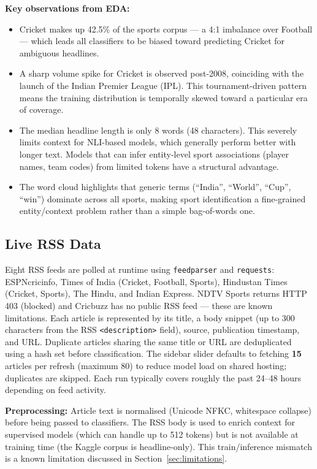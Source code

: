 \documentclass[11pt,a4paper]{article}
\begin{document}
\textbf{Key observations from EDA:}
\begin{itemize}[noitemsep]
  \item Cricket makes up 42.5\% of the sports corpus — a 4:1 imbalance over Football — which leads all classifiers to be biased toward predicting Cricket for ambiguous headlines.
  \item A sharp volume spike for Cricket is observed post-2008, coinciding with the launch of the Indian Premier League (IPL). This tournament-driven pattern means the training distribution is temporally skewed toward a particular era of coverage.
  \item The median headline length is only 8 words (48 characters). This severely limits context for NLI-based models, which generally perform better with longer text. Models that can infer entity-level sport associations (player names, team codes) from limited tokens have a structural advantage.
  \item The word cloud highlights that generic terms (``India'', ``World'', ``Cup'', ``win'') dominate across all sports, making sport identification a fine-grained entity/context problem rather than a simple bag-of-words one.
\end{itemize}

\subsection{Live RSS Data}

Eight RSS feeds are polled at runtime using \texttt{feedparser} and \texttt{requests}: ESPNcricinfo, Times of India (Cricket, Football, Sports), Hindustan Times (Cricket, Sports), The Hindu, and Indian Express. NDTV Sports returns HTTP 403 (blocked) and Cricbuzz has no public RSS feed — these are known limitations. Each article is represented by its title, a body snippet (up to 300 characters from the RSS \texttt{<description>} field), source, publication timestamp, and URL. Duplicate articles sharing the same title or URL are deduplicated using a hash set before classification. The sidebar slider defaults to fetching \textbf{15} articles per refresh (maximum 80) to reduce model load on shared hosting; duplicates are skipped. Each run typically covers roughly the past 24--48 hours depending on feed activity.

\textbf{Preprocessing:} Article text is normalised (Unicode NFKC, whitespace collapse) before being passed to classifiers. The RSS body is used to enrich context for supervised models (which can handle up to 512 tokens) but is not available at training time (the Kaggle corpus is headline-only). This train/inference mismatch is a known limitation discussed in Section~\ref{sec:limitations}.
\end{document}
